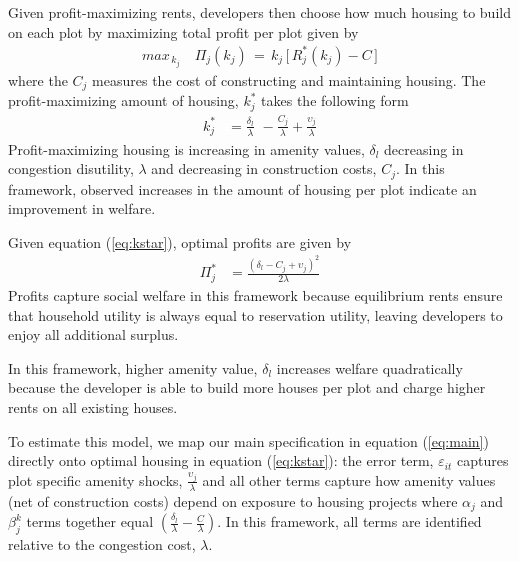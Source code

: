 \documentclass[12pt]{article}
\begin{document}
Given profit-maximizing rents, developers then choose how much housing to build on each plot by maximizing total profit per plot given by
\begin{align*}
max_{\,k_{j}} \,\,\,\,\,\, \Pi_{j}(k_{j}) \,=\, k_{j} \, \Big[ \, R_{j}^{*}(k_{j}) - C \, \Big ]
\end{align*}
\noindent where the $C_j$ measures the cost of constructing and maintaining housing.  The profit-maximizing amount of housing, $k^{*}_{j}$ takes the following form
\begin{align}
\label{eq:kstar}
k_{j}^{*} &= \frac{\delta_{l}}{\lambda} \,\, - \frac{C_j}{\lambda} + \frac{\upsilon_{j}}{\lambda}
\end{align}
Profit-maximizing housing is increasing in amenity values, $\delta_{l}$ decreasing in congestion disutility, $\lambda$ and decreasing in construction costs, $C_j$.  In this framework, observed increases in the amount of housing per plot indicate an improvement in welfare.

Given equation (\ref{eq:kstar}), optimal profits are given by
\begin{align*}
\Pi_{j}^{*}  &= \frac{(\delta_{l}-C_j + \upsilon_{j} )^2}{2\lambda}
\end{align*}
Profits capture social welfare in this framework because equilibrium rents ensure that household utility is always equal to reservation utility, leaving developers to enjoy all additional surplus.

In this framework, higher amenity value, $\delta_{l}$ increases welfare quadratically because the developer is able to build more houses per plot and charge higher rents on all existing houses.

To estimate this model, we map our main specification in equation (\ref{eq:main}) directly onto optimal housing in equation (\ref{eq:kstar}): the error term, $\varepsilon_{it}$ captures plot specific amenity shocks, $\frac{\upsilon_{j}}{\lambda}$ and all other terms capture how amenity values (net of construction costs) depend on exposure to housing projects where $\alpha_j$ and $\beta^{k}_j$ terms together equal $(\frac{\delta_{l}}{\lambda} -\frac{C}{\lambda})$.  In this framework, all terms are identified relative to the congestion cost, $\lambda$.
\end{document}
